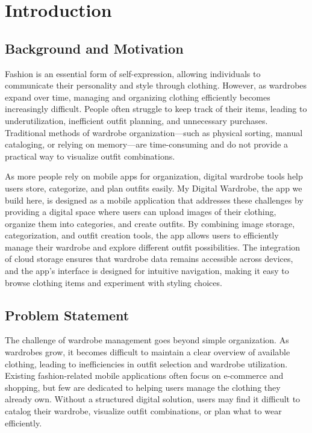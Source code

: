 
\chapter{Introduction}\label{intro}

\section{Background and Motivation}
Fashion is an essential form of self-expression, allowing individuals to communicate their personality and style through clothing. However, as wardrobes expand over time, managing and organizing clothing efficiently becomes increasingly difficult. People often struggle to keep track of their items, leading to underutilization, inefficient outfit planning, and unnecessary purchases. Traditional methods of wardrobe organization—such as physical sorting, manual cataloging, or relying on memory—are time-consuming and do not provide a practical way to visualize outfit combinations.

As more people rely on mobile apps for organization, digital wardrobe tools help users store, categorize, and plan outfits easily. My Digital Wardrobe, the app we build here, is designed as a mobile application that addresses these challenges by providing a digital space where users can upload images of their clothing, organize them into categories, and create outfits. By combining image storage, categorization, and outfit creation tools, the
 app allows users to efficiently manage their wardrobe and explore different outfit possibilities. The integration of cloud storage ensures that wardrobe data remains accessible across devices, and the app’s interface is designed for intuitive navigation, making it easy to browse clothing items and experiment with styling choices.

\section{Problem Statement}
The challenge of wardrobe management goes beyond simple organization. As wardrobes grow, it becomes difficult to maintain a clear overview of available clothing, leading to inefficiencies in outfit selection and wardrobe utilization. Existing fashion-related mobile applications often focus on e-commerce and shopping, but few are dedicated to helping users manage the clothing they already own. Without a structured digital solution, users may find it difficult to catalog their wardrobe, visualize outfit combinations, or plan what to wear efficiently.

